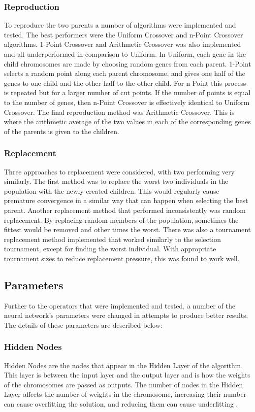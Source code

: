 \documentclass[sigconf]{acmart}
\begin{document}
\subsubsection{Reproduction}
To reproduce the two parents a number of algorithms were implemented and tested. The best performers were the Uniform Crossover and n-Point Crossover algorithms. 1-Point Crossover and Arithmetic Crossover was also implemented and all underperformed in comparison to Uniform. In Uniform, each gene in the child chromosomes are made by choosing random genes from each parent. 1-Point selects a random point along each parent chromosome, and gives one half of the genes to one child and the other half to the other child. For n-Point this process is repeated but for a larger number of cut points. If the number of points is equal to the number of genes, then n-Point Crossover is effectively identical to Uniform Crossover. The final reproduction method was Arithmetic Crossover. This is where the arithmetic average of the two values in each of the corresponding genes of the parents is given to the children.
\subsubsection{Replacement}
Three approaches to replacement were considered, with two performing very similarly. The first method was to replace the worst two individuals in the population with the newly created children. This would regularly cause premature convergence in a similar way that can happen when selecting the best parent. Another replacement method that performed inconsistently was random replacement. By replacing random members of the population, sometimes the fittest would be removed and other times the worst. There was also a tournament replacement method implemented that worked similarly to the selection tournament, except for finding the worst individual. With appropriate tournament sizes to reduce replacement pressure, this was found to work well.

\subsection{Parameters}
Further to the operators that were implemented and tested, a number of the neural network's parameters were changed in attempts to produce better results. The details of these parameters are described below:
\subsubsection{Hidden Nodes}
Hidden Nodes are the nodes that appear in the Hidden Layer of the algorithm. This layer is between the input layer and the output layer and is how the weights of the chromosomes are passed as outputs. The number of nodes in the Hidden Layer affects the number of weights in the chromosome, increasing their number can cause overfitting the solution, and reducing them can cause underfitting \cite{panchal11}.
\end{document}
